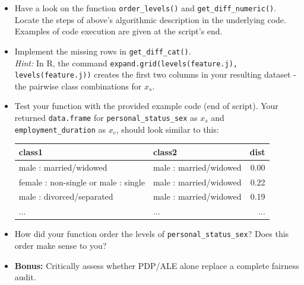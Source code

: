 {\begin{enumerate}[a)]
\begin{itemize}
  \item Have a look on the function \texttt{order\_levels()} and \texttt{get\_diff\_numeric()}. 
  Locate the steps of above's  algorithmic description in the underlying code.
  Examples of code execution are given at the script's end. 
  \item Implement the missing rows in \texttt{get\_diff\_cat()}.\\
  \textit{Hint:} In R, the command \texttt{expand.grid(levels(feature.j), levels(feature.j))} creates the first two columns in 
your resulting dataset - the pairwise class combinations for $x_s$.
  \item Test your function with the provided example code (end of script). 
  Your returned \texttt{data.frame} for \texttt{personal\_status\_sex} as $x_s$ 
  and \texttt{employment\_duration} as $x_c$, should look 
  similar to this: 

\begin{table}[ht]
\centering
\begin{tabular}{llr}
  \hline
 class1 & class2 & dist \\ 
  \hline
male : married/widowed & male : married/widowed & 0.00 \\ 
female : non-single or male : single & male : married/widowed & 0.22 \\ 
male : divorced/separated & male : married/widowed & 0.19 \\ 
  ... & ... & ... \\
   \hline
\end{tabular}
\end{table}

\item How did your function order the levels of \texttt{personal\_status\_sex}? 
Does this order make sense to you? 

\item \textbf{Bonus:} Critically assess whether PDP/ALE alone replace a complete fairness audit.

\end{itemize}
\end{enumerate}
}
